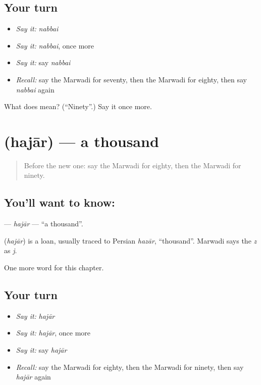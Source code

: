 \subsection*{Your turn}
\begin{itemize}
\raggedright
  \item \emph{Say it:} \emph{nabbai}
  \item \emph{Say it:} \emph{nabbai}, once more
  \item \emph{Say it:} say \emph{nabbai}
  \item \emph{Recall:} say the Marwadi for seventy, then the Marwadi for eighty, then say \emph{nabbai} again
\end{itemize}

\begin{tcolorbox}[breakable,colback=teal!4,colframe=teal!35!black,title={Before you move on}]
What does  mean? (\textquotedblleft{}Ninety\textquotedblright{}.) Say it once more.
\end{tcolorbox}
\section[\texorpdfstring{\mw{हजार} (hajār)}{हजार (hajār)}]{ (hajār) — a thousand}

\label{lesson:MW-C87-hajar}



\begin{quote}
Before the new one: say the Marwadi for eighty, then the Marwadi for ninety.
\end{quote}

\subsection*{You'll want to know: }
\textbf{} — \emph{hajār} — \textquotedblleft{}a thousand\textquotedblright{}.

\begin{cousinweb}
\textbf{} (\emph{hajār}) is a loan, usually traced to Persian \emph{hazār}, \textquotedblleft{}thousand\textquotedblright{}. Marwadi says the \emph{z} as \emph{j}.
\end{cousinweb}

\begin{grammarlens}[title={What you've built}]
One more word for this chapter.
\end{grammarlens}

\subsection*{Your turn}
\begin{itemize}
\raggedright
  \item \emph{Say it:} \emph{hajār}
  \item \emph{Say it:} \emph{hajār}, once more
  \item \emph{Say it:} say \emph{hajār}
  \item \emph{Recall:} say the Marwadi for eighty, then the Marwadi for ninety, then say \emph{hajār} again
\end{itemize}

